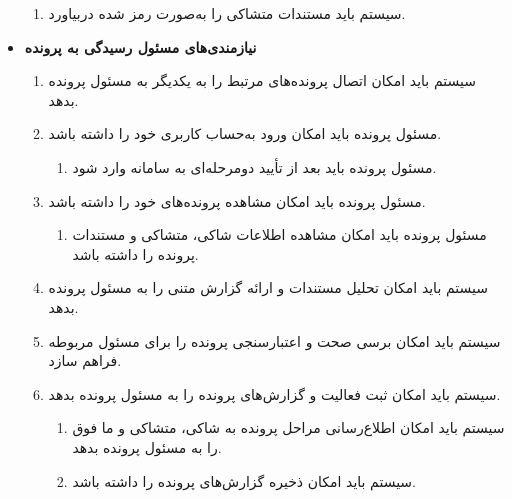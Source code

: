 \documentclass[12pt,a4paper,oneside]{article}
\begin{document}
\begin{itemize}
\begin{enumerate}
		\item 
        سیستم باید مستندات متشاکی را به‌صورت رمز شده دربیاورد.
    \end{enumerate}

    \item
    \textbf{نیازمندی‌های مسئول رسیدگی به پرونده}
    \begin{enumerate}
        \renewcommand{\labelenumi}{\textbf{.R\arabic{enumi}}}
        \setcounter{enumi}{38}

        \item 
        سیستم باید امکان اتصال پرونده‌های مرتبط را به یکدیگر به مسئول پرونده بدهد.

        \item 
        مسئول پرونده باید امکان ورود به‌حساب کاربری خود را داشته باشد.
        \begin{enumerate}
            \renewcommand{\labelenumii}{\textbf{.R\arabic{enumi}.\arabic{enumii}}}
            \item 
            مسئول پرونده باید بعد از تأیید دومرحله‌ای به سامانه وارد شود.
        \end{enumerate}

        \item 
        مسئول پرونده باید امکان مشاهده پرونده‌های خود را داشته باشد.
        \begin{enumerate}
            \renewcommand{\labelenumii}{\textbf{.R\arabic{enumi}.\arabic{enumii}}}
            \item 
            مسئول پرونده باید امکان مشاهده اطلاعات شاکی، متشاکی و مستندات پرونده را داشته باشد.
        \end{enumerate}

        \item 
        سیستم باید امکان تحلیل مستندات و ارائه گزارش متنی را به مسئول پرونده بدهد.

        \item 
        سیستم باید امکان برسی صحت و اعتبارسنجی پرونده را برای مسئول مربوطه فراهم سازد.

        \item 
        سیستم باید امکان ثبت فعالیت و گزارش‌های پرونده را به مسئول پرونده بدهد.
        \begin{enumerate}
            \renewcommand{\labelenumii}{\textbf{.R\arabic{enumi}.\arabic{enumii}}}
            \item 
            سیستم باید امکان اطلاع‌رسانی مراحل پرونده به شاکی، متشاکی و ما فوق را به مسئول پرونده بدهد.
            \item 
            سیستم باید امکان ذخیره گزارش‌های پرونده را داشته باشد.
        \end{enumerate}


\end{enumerate}
\end{itemize}
\end{document}

